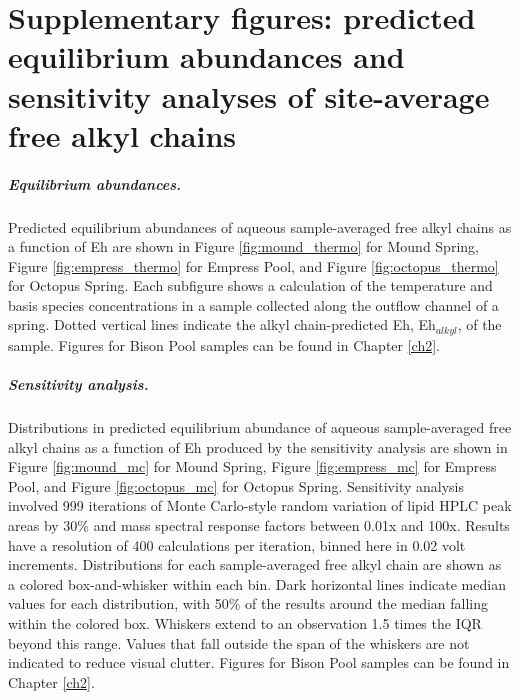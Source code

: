 \chapter{Supplementary figures: predicted equilibrium abundances and sensitivity analyses of site-average free alkyl chains}\label{app2}

\doublespace

\paragraph*{Equilibrium abundances.} Predicted equilibrium abundances of aqueous sample-averaged free alkyl chains as a function of Eh are shown in Figure \ref{fig:mound_thermo} for Mound Spring, Figure \ref{fig:empress_thermo} for Empress Pool, and Figure \ref{fig:octopus_thermo} for Octopus Spring. Each subfigure shows a calculation of the temperature and basis species concentrations in a sample collected along the outflow channel of a spring. Dotted vertical lines indicate the alkyl chain-predicted Eh, Eh$_{alkyl}$, of the sample. Figures for Bison Pool samples can be found in Chapter \ref{ch2}.

\paragraph*{Sensitivity analysis.}
Distributions in predicted equilibrium abundance of aqueous sample-averaged free alkyl chains as a function of Eh produced by the sensitivity analysis are shown in Figure \ref{fig:mound_mc} for Mound Spring, Figure \ref{fig:empress_mc} for Empress Pool, and Figure \ref{fig:octopus_mc} for Octopus Spring. Sensitivity analysis involved 999 iterations of Monte Carlo-style random variation of lipid HPLC peak areas by 30\% and mass spectral response factors between 0.01x and 100x. Results have a resolution of 400 calculations per iteration, binned here in 0.02 volt increments. Distributions for each sample-averaged free alkyl chain are shown as a colored box-and-whisker within each bin. Dark horizontal lines indicate median values for each distribution, with 50\% of the results around the median falling within the colored box. Whiskers extend to an observation 1.5 times the IQR beyond this range. Values that fall outside the span of the whiskers are not indicated to reduce visual clutter. Figures for Bison Pool samples can be found in Chapter \ref{ch2}.

